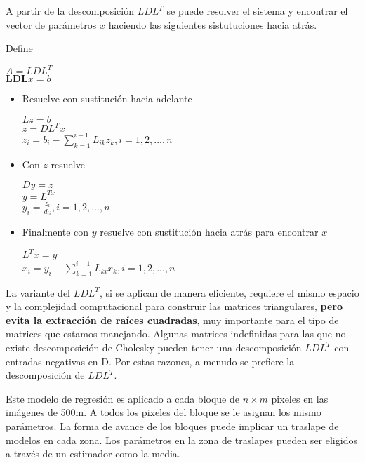 {A partir de la descomposición $LDL^{T}$ se puede resolver el sistema y encontrar el vector de parámetros $x$ haciendo las siguientes sistutuciones hacia atrás. 

Define 

\begin{center}
$A = LDL^{T}$ \\
$\mathbf{LDL}x = b$
\end{center}

\begin{itemize}
\item Resuelve con sustitución hacia adelante
\begin{center}
$Lz = b$\\
$z = DL^{T}x$\\
$z_{i} = b_{i} - \sum_{k=1}^{i-1}L_{ik}z_{k}, i=1,2,...,n$
\end{center}
\item Con $z$ resuelve
\begin{center}
$Dy = z$\\
$y = L^{Tx}$\\
$y_{i} = \frac{z_{i}}{d_{ii}}, i=1,2,...,n$
\end{center}
\item Finalmente con $y$ resuelve con sustitución hacia atrás para encontrar $x$
\begin{center}
$L^{T}x = y$\\
$x_{i} = y_{i} - \sum_{k=1}^{i-1}L_{ki}x_{k}, i=1,2,...,n$
\end{center}
\end{itemize}

La variante del $LDL^{T}$, si se aplican de manera eficiente, requiere el mismo espacio y la complejidad computacional para construir las matrices triangulares, \textbf{pero evita la extracción de raíces cuadradas}, muy importante para el tipo de matrices que estamos manejando. Algunas matrices indefinidas para las que no existe descomposición de Cholesky pueden tener una descomposición $LDL^{T}$ con entradas negativas en D. Por estas razones, a menudo se prefiere la descomposición de $LDL^{T}$. }%

Este modelo de regresión es aplicado a cada bloque de $n \times m$ pixeles en las imágenes de 500m. A todos los pixeles del bloque se le asignan los mismo parámetros. La forma de avance de los bloques puede implicar un traslape de modelos en cada zona. Los parámetros en la zona de traslapes pueden ser eligidos a través de un estimador como la media.

